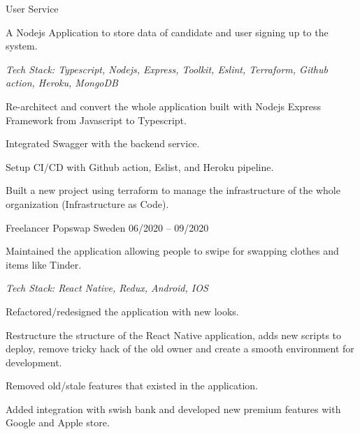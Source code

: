 \begin{cventries}
\cventry
    {User Service} %
    {} %
    {} %
    {} %
    {
      \begin{cvitems} %
        \item {A Nodejs Application to store data of candidate and user signing up to the system.}
        \item[] {\it Tech Stack: Typescript, Nodejs, Express, Toolkit, Eslint, Terraform, Github action, Heroku, MongoDB}
        \item {Re-architect and convert the whole application built with Nodejs Express Framework from Javascript to Typescript.}
        \item {Integrated Swagger with the backend service.}
        \item {Setup CI/CD with Github action, Eslist, and Heroku pipeline.}
        \item {Built a new project using terraform to manage the infrastructure of the whole organization (Infrastructure as Code).}
      \end{cvitems}
    }

  \cventry
    {Freelancer} %
    {Popswap} %
    {Sweden} %
    {06/2020 -- 09/2020} %
    {
      \begin{cvitems} %
        \item {Maintained the application allowing people to swipe for swapping clothes and items like Tinder.}
        \item[] {\it Tech Stack: React Native, Redux, Android, IOS}
        \item {Refactored/redesigned the application with new looks.}
        \item {Restructure the structure of the React Native application, adds new scripts to deploy, remove tricky hack of the old owner and create a smooth environment for development.}
        \item {Removed old/stale features that existed in the application.}
        \item {Added integration with swish bank and developed new premium features with Google and Apple store. }
      \end{cvitems}
    }
    


\end{cventries}
